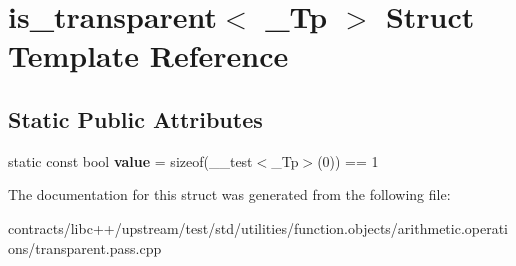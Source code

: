 \hypertarget{structis__transparent}{}\section{is\+\_\+transparent$<$ \+\_\+\+Tp $>$ Struct Template Reference}
\label{structis__transparent}
\subsection*{Static Public Attributes}
\begin{DoxyCompactItemize}
\item 
\mbox{\label{structis__transparent_aba43624a1bfdc6c9977473abc09f4134}} 
static const bool {\bfseries value} = sizeof(\+\_\+\+\_\+test$<$\+\_\+\+Tp$>$(0)) == 1
\end{DoxyCompactItemize}


The documentation for this struct was generated from the following file\+:\begin{DoxyCompactItemize}
\item 
contracts/libc++/upstream/test/std/utilities/function.\+objects/arithmetic.\+operations/transparent.\+pass.\+cpp\end{DoxyCompactItemize}
